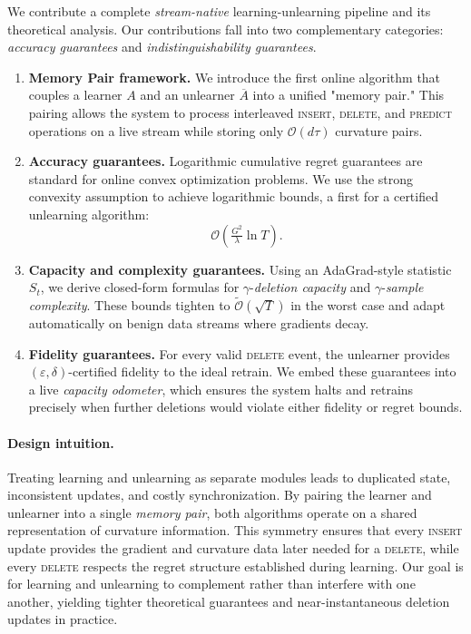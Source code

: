 \documentclass{article}
\theoremstyle{ssltheorem}
\begin{document}
We contribute a complete \emph{stream-native} learning-unlearning pipeline and its theoretical analysis.
Our contributions fall into two complementary categories: \emph{accuracy guarantees} and \emph{indistinguishability guarantees}.
\begin{enumerate}
    \item \textbf{Memory Pair framework.} We introduce the first online algorithm that couples a learner $A$ and an unlearner $\overline{A}$ into a unified "memory pair."
This pairing allows the system to process interleaved \textsc{insert}, \textsc{delete}, and \textsc{predict} operations on a live stream while storing only $\mathcal{O}(d\tau)$ curvature pairs.
\item \textbf{Accuracy guarantees.} Logarithmic cumulative regret guarantees are standard for online convex optimization problems.
We use the strong convexity assumption to achieve logarithmic bounds, a first for a certified unlearning algorithm:
    $$
    \mathcal{O}\!\left(\tfrac{G^{2}}{\lambda}\ln T\right).
$$ 

    \item \textbf{Capacity and complexity guarantees.} Using an AdaGrad-style statistic $S_{t}$, we derive closed-form formulas for $\gamma$-\emph{deletion capacity} and $\gamma$-\emph{sample complexity}.
These bounds tighten to $\widetilde{\mathcal{O}}(\sqrt{T})$ in the worst case and adapt automatically on benign data streams where gradients decay.
\item \textbf{Fidelity guarantees.} For every valid \textsc{delete} event, the unlearner provides $(\varepsilon,\delta)$-certified fidelity to the ideal retrain.
We embed these guarantees into a live \emph{capacity odometer}, which ensures the system halts and retrains precisely when further deletions would violate either fidelity or regret bounds.
\end{enumerate}

\paragraph{Design intuition.}  
Treating learning and unlearning as separate modules leads to duplicated state, inconsistent updates, and costly synchronization.
By pairing the learner and unlearner into a single \emph{memory pair}, both algorithms operate on a shared representation of curvature information.
This symmetry ensures that every \textsc{insert} update provides the gradient and curvature data later needed for a \textsc{delete}, while every \textsc{delete} respects the regret structure established during learning.
Our goal is for learning and unlearning to complement rather than interfere with one another, yielding tighter theoretical guarantees and near-instantaneous deletion updates in practice.
\end{document}
